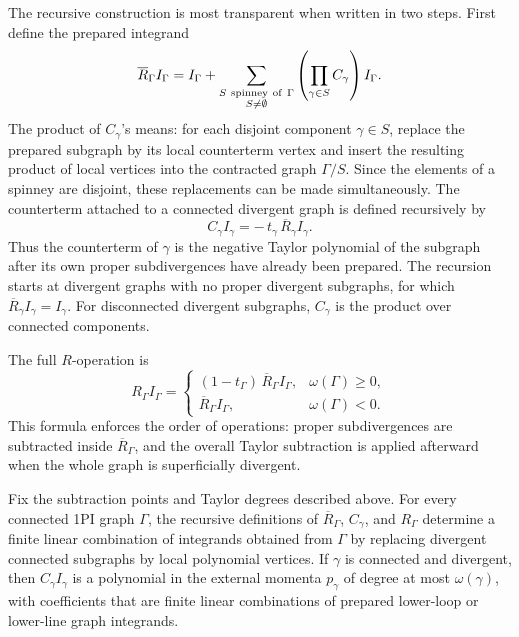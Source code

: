 The recursive construction is most transparent when written in two steps.
First define the prepared integrand
\[
  \overline R_\Gamma I_\Gamma
  =
  I_\Gamma
  +
  \sum_{\substack{S\ {\rm spinney\ of}\ \Gamma\\S\ne\emptyset}}
  \left(\prod_{\gamma\in S} C_\gamma\right) I_\Gamma .
\]
The product of \(C_\gamma\)'s means: for each disjoint component
\(\gamma\in S\), replace the prepared subgraph by its local counterterm vertex
and insert the resulting product of local vertices into the contracted graph
\(\Gamma/S\).  Since the elements of a spinney are disjoint, these
replacements can be made simultaneously.  The counterterm attached to a
connected divergent graph is defined recursively by
\[
  C_\gamma I_\gamma
  =
  -\,t_\gamma\,\overline R_\gamma I_\gamma .
\]
Thus the counterterm of \(\gamma\) is the negative Taylor polynomial of the
subgraph after its own proper subdivergences have already been prepared.  The
recursion starts at divergent graphs with no proper divergent subgraphs, for
which \(\overline R_\gamma I_\gamma=I_\gamma\).  For disconnected divergent
subgraphs, \(C_\gamma\) is the product over connected components.

The full \(R\)-operation is
\[
  R_\Gamma I_\Gamma
  =
  \begin{cases}
    (1-t_\Gamma)\,\overline R_\Gamma I_\Gamma,
      & \omega(\Gamma)\ge0,\\[4pt]
    \overline R_\Gamma I_\Gamma,
      & \omega(\Gamma)<0.
  \end{cases}
\]
This formula enforces the order of operations: proper subdivergences are
subtracted inside \(\overline R_\Gamma\), and the overall Taylor subtraction
is applied afterward when the whole graph is superficially divergent.

\begin{proposition}
\label{prop:bogoliubov-preparation-recursion}
Fix the subtraction points and Taylor degrees described above.  For every
connected 1PI graph \(\Gamma\), the recursive definitions of
\(\overline R_\Gamma\), \(C_\gamma\), and \(R_\Gamma\) determine a finite
linear combination of integrands obtained from \(\Gamma\) by replacing
divergent connected subgraphs by local polynomial vertices.  If
\(\gamma\) is connected and divergent, then \(C_\gamma I_\gamma\) is a
polynomial in the external momenta \(p_\gamma\) of degree at most
\(\omega(\gamma)\), with coefficients that are finite linear combinations of
prepared lower-loop or lower-line graph integrands.
\end{proposition}

